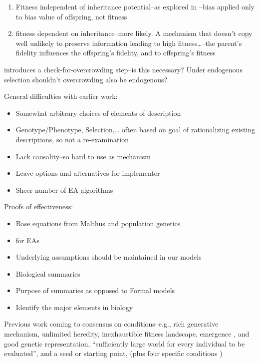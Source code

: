 \begin{enumerate}
	\item
	      Fitness independent of inheritance potential--as explored in
	      \autocite{Bourrat2015}--bias applied only to bias value of offspring, not fitness
	\item
	      fitness dependent on inheritance--more likely. A mechanism that doesn't copy well unlikely to preserve information leading to high
	      fitness\ldots{}--the parent's fidelity influences the offspring's fidelity, and to offspring's fitness
\end{enumerate}

\autocite{Bourrat2015} introduces a check-for-overcrowding step--is this necessary? Under endogenous selection shouldn't overcrowding also be endogenous?

General difficulties with earlier work:
\begin{itemize}
	\item Somewhat arbitrary choices of elements of description
	\item Genotype/Phenotype, Selection,\ldots{} often based on goal of rationalizing existing descriptions, so not a re-examination
	\item Lack causality--so hard to use as mechanism
	\item Leave options and alternatives for implementer
	\item Sheer number of EA algorithms
\end{itemize}

Proofs of effectiveness:
\begin{itemize}
	\item Base equations from Malthus and population genetics
	\item \autocite{Vose:1999di} for EAs
	\item Underlying assumptions should be maintained in our models
\end{itemize}

\autocite{Godfrey-Smith2007}
\begin{itemize}
	\item Biological summaries
	\item Purpose of summaries as opposed to Formal models
	\item Identify the major elements in biology
\end{itemize}

Previous work coming to consensus on conditions--e.g., rich generative mechanism, unlimited heredity, inexhaustible fitness landscape, emergence \autocite{Vasas2015}, and good genetic representation, ``sufficiently large world for every individual to be evaluated'', and a seed or starting point, (plus four specific conditions \autocite{Soros2014})







